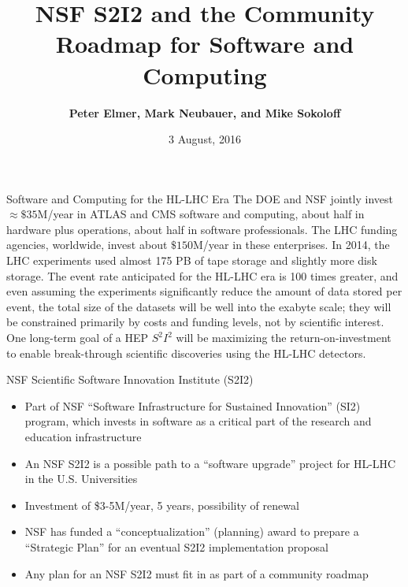 \documentclass[compress,10]{beamer}
\title{NSF S2I2 and the Community Roadmap for Software and Computing}
\author[Peter Elmer, Mark Neubauer, and Mike Sokoloff]
{
 \textcolor{LHCb dark}{\bf  Peter Elmer, Mark Neubauer, and Mike Sokoloff}
}
\date{3 August, 2016}
\begin{document}
\begin{frame}[noframenumbering]
	\titlepage
\end{frame}
\begin{frame}[fragile]{Software and Computing for the HL-LHC Era}{}
{\footnotesize
The DOE and NSF jointly invest $ \approx \$ 35 $M/year in
ATLAS and CMS software and computing, about half in hardware plus operations,
about half in software professionals.
The LHC funding agencies, worldwide, invest about $ \$ 150 $M/year
in these enterprises.
In 2014, the LHC experiments used almost 175 PB of tape storage and
slightly more disk storage.
The event rate anticipated for the HL-LHC era is 100 times greater,
and even assuming the experiments significantly reduce the
amount of data stored per event,
the total size of the datasets will be well into the exabyte
scale;
they will be constrained primarily by costs and funding levels,
not by scientific interest.
One long-term goal of a HEP $ S^2 I^2 $
will be
maximizing the return-on-investment to enable break-through
scientific discoveries using the  HL-LHC detectors.
}  %
\end{frame}
\begin{frame}[fragile]{NSF Scientific Software Innovation Institute (S2I2)}{}

{\footnotesize
\begin{itemize} 
\item Part of NSF ``Software Infrastructure for Sustained Innovation'' (SI2) program, which invests in software as a critical part of the research and education infrastructure
\item An NSF S2I2 is a possible path to a ``software upgrade'' project for HL-LHC in the U.S. Universities 
\item Investment of \$3-5M/year, 5 years, possibility of renewal
\item NSF has funded a ``conceptualization'' (planning) award to prepare a ``Strategic Plan'' for an eventual S2I2 implementation proposal
\item Any plan for an NSF S2I2 must fit in as part of a community roadmap
\end{itemize}
}  %

\end{frame}
\end{document}
